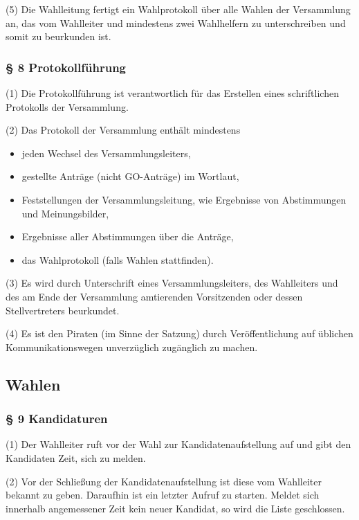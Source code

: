 (5) Die Wahlleitung fertigt ein Wahlprotokoll über alle Wahlen der
Versammlung an, das vom Wahlleiter und mindestens zwei Wahlhelfern zu
unterschreiben und somit zu beurkunden ist.

\subsubsection{§ 8 Protokollführung}

(1) Die Protokollführung ist verantwortlich für das Erstellen eines
schriftlichen Protokolls der Versammlung.

(2) Das Protokoll der Versammlung enthält mindestens

\begin{itemize}
\item
  jeden Wechsel des Versammlungsleiters,
\item
  gestellte Anträge (nicht GO-Anträge) im Wortlaut,
\item
  Feststellungen der Versammlungsleitung, wie Ergebnisse von
  Abstimmungen und Meinungsbilder,
\item
  Ergebnisse aller Abstimmungen über die Anträge,
\item
  das Wahlprotokoll (falls Wahlen stattfinden).
\end{itemize}
(3) Es wird durch Unterschrift eines Versammlungsleiters, des
Wahlleiters und des am Ende der Versammlung amtierenden Vorsitzenden
oder dessen Stellvertreters beurkundet.

(4) Es ist den Piraten (im Sinne der Satzung) durch Veröffentlichung auf
üblichen Kommunikationswegen unverzüglich zugänglich zu machen.

\subsection{Wahlen}

\subsubsection{§ 9 Kandidaturen}

(1) Der Wahlleiter ruft vor der Wahl zur Kandidatenaufstellung auf und
gibt den Kandidaten Zeit, sich zu melden.

(2) Vor der Schließung der Kandidatenaufstellung ist diese vom
Wahlleiter bekannt zu geben. Daraufhin ist ein letzter Aufruf zu
starten. Meldet sich innerhalb angemessener Zeit kein neuer Kandidat, so
wird die Liste geschlossen.

